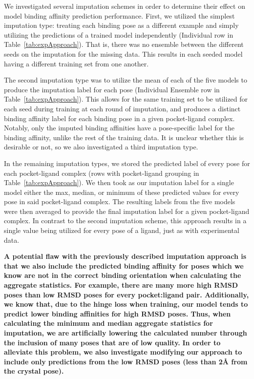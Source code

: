 \documentclass[journal=jcim,manuscript=article]{achemso}
\begin{document}
We investigated several imputation schemes in order to determine their effect on model binding affinity prediction performance.
First, we utilized the simplest imputation type: treating each binding pose as a different example and simply utilizing the predictions of a trained model independently (Individual row in Table~\ref{tab:expApproach}).
That is, there was no ensemble between the different seeds on the imputation for the missing data.
This results in each seeded model having a different training set from one another.

The second imputation type was to utilize the mean of each of the five models to produce the imputation label for each pose (Individual Ensemble row in Table~\ref{tab:expApproach}).
This allows for the same training set to be utilized for each seed during training at each round of imputation, and produces a distinct binding affinity label for each binding pose in a given pocket-ligand complex.
Notably, only the imputed binding affinities have a pose-specific label for the binding affinity, unlike the rest of the training data.
It is unclear whether this is desirable or not, so we also investigated a third imputation type.

In the remaining imputation types, we stored the predicted label of every pose for each pocket-ligand complex (rows with pocket-ligand grouping in Table~\ref{tab:expApproach}).
We then took as our imputation label for a single model either the max, median, or minimum of these predicted values for every pose in said pocket-ligand complex.
The resulting labels from the five models were then averaged to provide the final imputation label for a given pocket-ligand complex.
In contrast to the second imputation scheme, this approach results in a single value being utilized for every pose of a ligand, just as with experimental data.

\textbf{A potential flaw with the previously described imputation approach is that we also include the predicted binding affinity for poses which we know are not in the correct binding orientation when calculating the aggregate statistics.
For example, there are many more high RMSD poses than low RMSD poses for every pocket:ligand pair.
Additionally, we know that, due to the hinge loss when training, our model tends to predict lower binding affinities for high RMSD poses. \cite{crossdocked2020}
Thus, when calculating the minimum and median aggregate statistics for imputation, we are artificially lowering the calculated number through the inclusion of many poses that are of low quality.}
\textbf{In order to alleviate this problem, we also investigate modifying our approach to include only predictions from the low RMSD poses (less than 2{\AA} from the crystal pose).}
\end{document}
